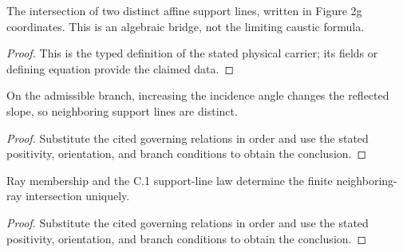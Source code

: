 \begin{definition}
  \label{def:physics:IPhO_2026_2_C_3:aux022}
  The intersection of two distinct affine support lines, written in Figure 2g coordinates. This is an algebraic bridge, not the limiting caustic formula.
\end{definition}
\begin{proof}
  This is the typed definition of the stated physical carrier; its fields or defining equation provide the claimed data.
\end{proof}

\begin{lemma}
  \label{lem:physics:IPhO_2026_2_C_3:aux023}
  On the admissible branch, increasing the incidence angle changes the reflected slope, so neighboring support lines are distinct.
\end{lemma}
\begin{proof}
  Substitute the cited governing relations in order and use the stated positivity, orientation, and branch conditions to obtain the conclusion.
\end{proof}

\begin{lemma}
  \label{lem:physics:IPhO_2026_2_C_3:aux024}
  Ray membership and the C.1 support-line law determine the finite neighboring-ray intersection uniquely.
\end{lemma}
\begin{proof}
  Substitute the cited governing relations in order and use the stated positivity, orientation, and branch conditions to obtain the conclusion.
\end{proof}

